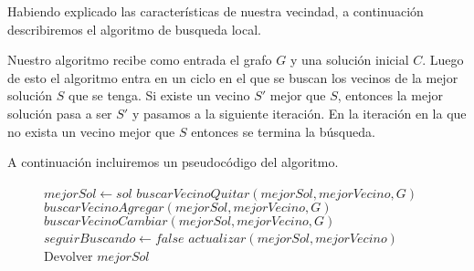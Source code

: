 Habiendo explicado las características de nuestra vecindad, a continuación describiremos el algoritmo de busqueda local.

Nuestro algoritmo recibe como entrada el grafo $G$ y una solución inicial $C$. Luego de esto el algoritmo entra en un ciclo en el que se buscan los vecinos de la mejor solución $S$ que se tenga. Si existe un vecino $S'$ mejor que $S$, entonces la mejor solución pasa a ser $S'$ y pasamos a la siguiente iteración. En la iteración en la que no exista un vecino mejor que $S$ entonces se termina la búsqueda.

A continuación incluiremos un pseudocódigo del algoritmo.
\begin{center}
 \begin{figure}[H]
  \begin{pseudo}
   \State $mejorSol \leftarrow sol$
      \State $buscarVecinoQuitar(mejorSol, mejorVecino, G)$
      \State $buscarVecinoAgregar(mejorSol, mejorVecino, G)$
      \State $buscarVecinoCambiar(mejorSol, mejorVecino, G)$
	\State $seguirBuscando \leftarrow false$
      \Else
	\State $actualizar(mejorSol, mejorVecino)$
      \EndIf
      \State Devolver $mejorSol$
   \EndWhile
   \EndProcedure
  \end{pseudo}
 \end{figure}
\end{center}


